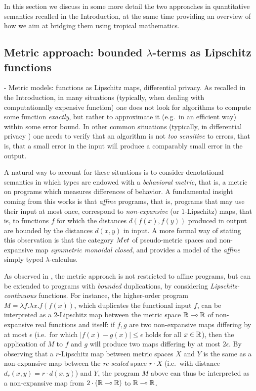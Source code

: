 

In this section we discuss in some more detail the two approaches in quantitative semantics recalled in the Introduction, at the same time providing an overview of how we aim at bridging them using tropical mathematics.

\subsection{Metric approach: bounded $\lambda$-terms as Lipschitz functions}

- Metric models: functions as Lipschitz maps, differential privacy.
As recalled in the Introduction, in many situations (typically, when dealing with computationally expensive function) one does not look for algorithms to compute some function \emph{exactly}, but rather to approximate it (e.g.~in an efficient way) within some error bound. In other common situations (typically, in differential privacy \cite{}) one needs to verify that an algorithm is not \emph{too sensitive} to errors, that is, that a small error in the input will produce a comparably small error in the output. 

A natural way to account for these situations is to consider denotational semantics in which types are endowed with a \emph{behavioral metric}, that is, a metric on programs which measures differences of behavior. 
A fundamental insight coming from this works is that \emph{affine} programs, that is, programs that may use their input at most once, correspond to \emph{non-expansive} (or $1$-Lipschitz) maps, that is, to functions $f$ for which the distances
$d(f(x),f(y))$ produced in output are bounded by the distances $d(x,y)$ in input. 
A more formal way of stating this observation is that the category $\Met$ of pseudo-metric spaces and non-expansive 
map \emph{symmetric monoidal closed}, and provides a model of the \emph{affine} simply typed $\lambda$-calculus. 

As observed in \cite{Gabo2017}, the metric approach is not restricted to affine programs, but can be extended to programs with \emph{bounded} duplications, by considering \emph{Lipschitz-continuous} functions.
For instance, the higher-order program $M=\lambda f.\lambda x.f(f(x))$, which duplicates the functional input $f$, can be interpreted as a $2$-Lipschitz map between the metric space $\mathbb{R}\multimap \mathbb{R}$ of non-expansive real functions and itself: if $f,g$ are two non-expansive maps differing by at most $\epsilon$ (i.e.~for which $|f(x)-g(x)|\leq \epsilon$ holds for all $x\in \mathbb{R}$), then the application of $M$ to $f$ and $g$ will produce two maps differing by at most $2\epsilon$. 
By observing that a $r$-Lipschitz map between metric spaces $X$ and $Y$ is the same as a non-expansive map between the \emph{re-scaled} space $r\cdot X$ (i.e.~with distance $d_{r}(x,y)=r\cdot d(x,y)$) and $Y$, the program $M$ above 
can thus be interpreted as a non-expansive map from $2\cdot(\mathbb{R}\multimap \mathbb{R})$ to $\mathbb{R}\multimap \mathbb{R}$.

